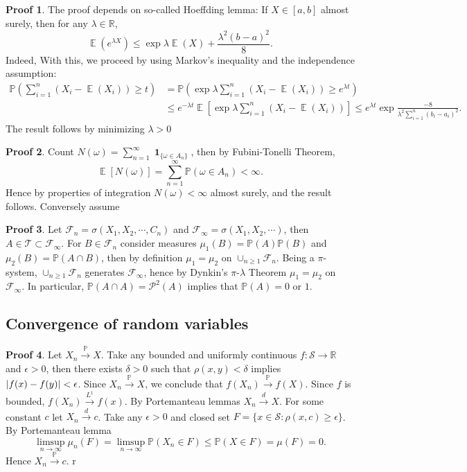 \documentclass[hidelinks,11pt]{article}
\theoremstyle{definition}
\theoremstyle{dotless}
\newtheorem{prop}{Proof}[section]
\theoremstyle{remark}
\DeclareMathOperator{\E}{\mathbb{E}}
\DeclareMathOperator{\1}{\mathbf{1}}
\begin{document}
\begin{prop}
The proof depends on so-called Hoeffding lemma: If $X\in[a,b]$ almost surely, then for any $\lambda\in\mathbb{R}$,
\[\E(e^{\lambda X})\leq\exp{\lambda\E(X)+\frac{\lambda^2(b-a)^2}{8}}.\]
Indeed,\medbreak
With this, we proceed by using Markov's inequality and the independence assumption:
\begin{align*}
    \mathbb{P}\left(\sum_{i=1}^n(X_i-\E(X_i))\geq t\right)&=\mathbb{P}\left(\exp{\lambda\sum_{i=1}^n(X_i-\E(X_i))}\geq e^{\lambda t}\right)\\
    &\leq e^{-\lambda t}\E\left[\exp{\lambda\sum_{i=1}^n(X_i-\E(X_i))}\right]\leq e^{\lambda t}\exp{\frac{-8}{\lambda^2\sum_{i=1}^n(b_i-a_i)^2}}.
\end{align*}
The result follows by minimizing $\lambda>0$
\end{prop}

\begin{prop}
Count $N(\omega)=\sum_{n=1}^\infty\1_{\{\omega\in A_n\}}$, then by Fubini-Tonelli Theorem,
\[\E[N(\omega)]=\sum_{n=1}^\infty\mathbb{P}(\omega\in A_n)<\infty.\] Hence by properties of integration $N(\omega)<\infty$ almost surely, and the result follows.\medbreak
Conversely assume
\end{prop}

\begin{prop}
Let $\mathcal{F}_n=\sigma(X_1,X_2,\cdots,C_n)$ and $\mathcal{F}_\infty=\sigma(X_1,X_2,\cdots)$, then $A\in\mathcal{T}\subset\mathcal{F}_\infty$. For $B\in\mathcal{F}_n$ consider measures $\mu_1(B)=\mathbb{P}(A)\mathbb{P}(B)$ and $\mu_2(B)=\mathbb{P}(A\cap B)$, then by definition $\mu_1=\mu_2$ on $\cup_{n\geq1}\mathcal{F}_n$. Being a $\pi$-system, $\cup_{n\geq1}\mathcal{F}_n$ generates $\mathcal{F}_\infty$, hence by Dynkin's $\pi$-$\lambda$ Theorem $\mu_1=\mu_2$ on $\mathcal{F}_\infty$. In particular, $\mathbb{P}(A\cap A)=\mathcal{P}^2(A)$ implies that $\mathbb{P}(A)=0$ or $1$.
\end{prop}

\subsection{Convergence of random variables}

\begin{prop}
Let $X_n\xrightarrow{\mathbb{P}}X$. Take any bounded and uniformly continuous $f:\mathcal{S}\to\mathbb{R}$ and $\epsilon>0$, then there exists $\delta>0$ such that $\rho(x,y)<\delta$ implies $\abs{f(x)-f(y)}<\epsilon$. Since $X_n\xrightarrow{\mathbb{P}}X$, we conclude that $f(X_n)\xrightarrow{\mathbb{P}}f(X)$. Since $f$ is bounded, $f(X_n)\xrightarrow{L^1}f(x)$. By Portemanteau lemmas $X_n\xrightarrow{d}X$.\medbreak
For some constant $c$ let $X_n\xrightarrow{d}c$. Take any $\epsilon>0$ and closed set $F=\{x\in\mathcal{S}:\rho(x,c)\geq\epsilon\}$. By Portemanteau lemma
\[\limsup_{n\to\infty}\mu_n(F)=\limsup_{n\to\infty}\mathbb{P}(X_n\in F)\leq\mathbb{P}(X\in F)=\mu(F)=0.\]
Hence $X_n\xrightarrow{\mathbb{P}}c$.\medbreak
r
\end{prop}
\end{document}

